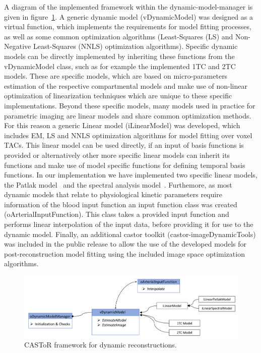 A diagram of the implemented framework within the dynamic-model-manager is given in figure~\ref{fig3_2:DynamicModelManager}. 
A generic dynamic model (vDynamicModel) was designed as a virtual function, which implements the requirements for model fitting processes, as well as some common optimization algorithms (Least-Squares (LS) and Non-Negative Least-Squares (NNLS) optimization algorithms).
Specific dynamic models can be directly implemented by inheriting these functions from the vDynamicModel class, such as for example the implemented 1TC and 2TC models. These are specific models, which are based on micro-parameters estimation of the respective compartmental models and make use of non-linear optimization of linearization techniques which are unique to these specific implementations. 
Beyond these specific models, many models used in practice for parametric imaging are linear models and share common optimization methods. For this reason a generic Linear model (iLinearModel) was developed, which includes EM, LS and NNLS optimization algorithms for model fitting over voxel TACs. This linear model can be used directly, if an input of basis functions is provided or alternatively other more specific linear models can inherit its functions and make use of model specific functions for defining temporal basis functions.
In our implementation we have implemented two specific linear models, the Patlak model~\cite{Patlak1985} and the spectral analysis model~\cite{Cunningham1993}. 
Furthemore, as most dynamic models that relate to physiological kinetic parameters require information of the blood input function an input function class was created (oArterialInputFunction). This class takes a provided input function and performs linear interpolation of the input data, before providing it for use to the dynamic model. 
Finally, an additional castor toolkit (castor-imageDynamicTools) was included in the public release to allow the use of the developed models for post-reconstruction model fitting using the included image space optimization algorithms. 

\begin{figure} [ht!]
\centering
\includegraphics[scale=0.48,angle=0]{3_Results/3_2_Dynamic_Reconstruction_SimulationStudy/figures/oDynamicModelManager.pdf}
\caption{CASToR framework for dynamic reconstructions.} 
\label{fig3_2:DynamicModelManager}
\end{figure}


